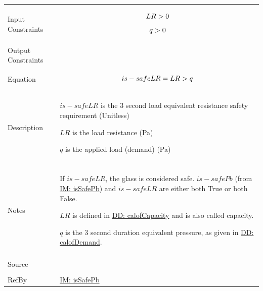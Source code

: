 \documentclass[12pt]{article}
\newcommand{\gt}{\ensuremath >}
\begin{document}
\begin{minipage}{\textwidth}
\begin{tabular}{>{\raggedright}p{}>{\raggedright\arraybackslash}p{}}
\\ \midrule \\
Input Constraints & \begin{displaymath}
                    LR\gt{}0
                    \end{displaymath}
                    \begin{displaymath}
                    q\gt{}0
                    \end{displaymath}
\\ \midrule \\
Output Constraints & 
\\ \midrule \\
Equation & \begin{displaymath}
           is-safeLR=LR\gt{}q
           \end{displaymath}
\\ \midrule \\
Description & \begin{symbDescription}
              \item{$is-safeLR$ is the 3 second load equivalent resistance safety requirement (Unitless)}
              \item{$LR$ is the load resistance (Pa)}
              \item{$q$ is the applied load (demand) (Pa)}
              \end{symbDescription}
\\ \midrule \\
Notes & If $is-safeLR$, the glass is considered safe. $is-safePb$ (from \hyperref[IM:isSafePb]{IM: isSafePb}) and $is-safeLR$ are either both True or both False.
        
        $LR$ is defined in \hyperref[DD:calofCapacity]{DD: calofCapacity} and is also called capacity.
        
        $q$ is the 3 second duration equivalent pressure, as given in \hyperref[DD:calofDemand]{DD: calofDemand}.
        
\\ \midrule \\
Source & \cite{astm2009}
         
\\ \midrule \\
RefBy & \hyperref[IM:isSafePb]{IM: isSafePb}
        
\\ \bottomrule
\end{tabular}
\end{minipage}
\end{document}
